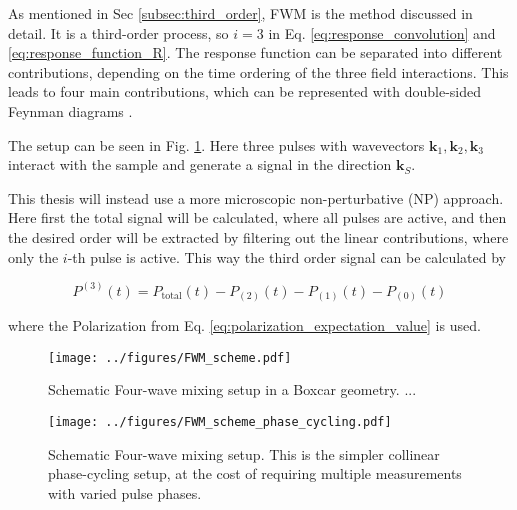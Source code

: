 \noindent
As mentioned in Sec \ref{subsec:third_order}, FWM is the method discussed in detail. It is a third-order process, so $i=3$ in Eq. \eqref{eq:response_convolution} and \eqref{eq:response_function_R}. The response function can be separated into different contributions, depending on the time ordering of the three field interactions. This leads to four main contributions, which can be represented with double-sided Feynman diagrams \cite{mukamel1995principlesnonlinearoptical}.


The setup can be seen in Fig. \ref{fig:fwm_box_car_setup}. Here three pulses with wavevectors $\mathbf{k}_1, \mathbf{k}_2, \mathbf{k}_3$ interact with the sample and generate a signal in the direction $\mathbf{k}_S$. 

\noindent
This thesis will instead use a more microscopic non-perturbative (NP) approach.
Here first the total signal will be calculated, where all pulses are active, and then the desired order will be extracted by filtering out the linear contributions, where only the $i$-th pulse is active.
This way the third order signal can be calculated by 

\begin{equation}
	P^{(3)}(t) = P_{\text{total}}(t) - P_{(2)}(t) - P_{(1)}(t) - P_{(0)}(t)
	\label{eq:third_order_signal_numerical}
\end{equation}

\noindent
where the Polarization from Eq. \eqref{eq:polarization_expectation_value} is used. 



\begin{figure}[ht]
	\centering
	\texttt{[image: ../figures/FWM\_scheme.pdf]}
	\caption{Schematic Four-wave mixing setup in a Boxcar geometry. ... }
	\label{fig:fwm_box_car_setup}
\end{figure}

\begin{figure}[ht]
	\centering
	\texttt{[image: ../figures/FWM\_scheme\_phase\_cycling.pdf]}
	\caption{Schematic Four-wave mixing setup. This is the simpler collinear phase-cycling setup, at the cost of requiring multiple measurements with varied pulse phases.
	}
	\label{fig:fwm_phase_cycling_setup}
\end{figure}

